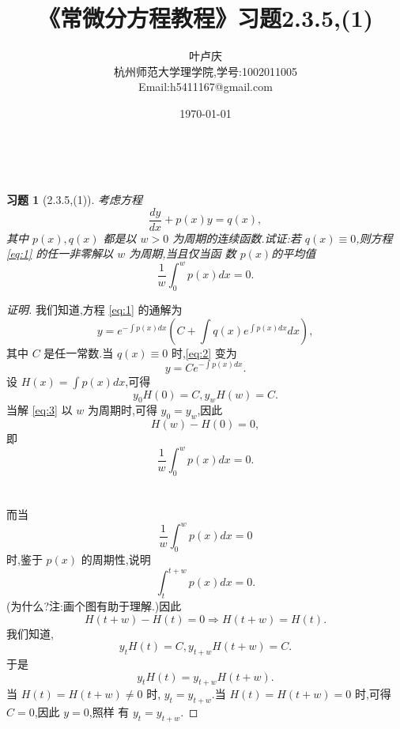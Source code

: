 \documentclass[a4paper, 12pt]{article} %
\title{\textbf{《常微分方程教程》习题2.3.5,(1)}}
\author{\small{叶卢庆}\\{\small{杭州师范大学理学院,学号:1002011005}}\\{\small{Email:h5411167@gmail.com}}}
\date{\today}
\makeatletter
\newtheorem*{cdtheorem}{习题}
\newenvironment{exercise}
{\bigskip\begin{mdframed}[backgroundcolor=gray!40,rightline=false,leftline=false,topline=false,bottomline=false]\begin{cdtheorem}}
    {\end{cdtheorem}\end{mdframed}\bigskip}
\renewcommand{\maketitle}{ %
  \renewcommand\refname{参考文献}
  \newcommand{\D}{\displaystyle}\newcommand{\ri}{\Rightarrow}
  \newcommand{\ds}{\displaystyle} \renewcommand{\ni}{\noindent}
  \newcommand{\pa}{\partial} \newcommand{\Om}{\Omega}
  \newcommand{\om}{\omega} \newcommand{\sik}{\sum_{i=1}^k}
  \newcommand{\vov}{\Vert\omega\Vert} \newcommand{\Umy}{U_{\mu_i,y^i}}
  \newcommand{\lamns}{\lambda_n^{^{\scriptstyle\sigma}}}
  \newcommand{\chiomn}{\chi_{_{\Omega_n}}}
  \newcommand{\ullim}{\underline{\lim}} \newcommand{\bsy}{\boldsymbol}
  \newcommand{\mvb}{\mathversion{bold}} \newcommand{\la}{\lambda}
  \newcommand{\La}{\Lambda} \newcommand{\va}{\varepsilon}
  \begin{flushright} %
    {\LARGE\@title} %
    
    \vspace{50pt} %
    
    {\large\@author} %
    \\\@date %
    
    \vspace{40pt}
  \end{flushright}
}
\makeatother
\begin{document}
\maketitle
\begin{exercise}[2.3.5,(1)]
  考虑方程
  \begin{equation}
    \label{eq:1}
    \frac{dy}{dx}+p(x)y=q(x),
  \end{equation}
  其中 $p(x),q(x)$ 都是以 $w>0$ 为周期的连续函数.试证:若 $q(x)\equiv
  0$,则方程 \eqref{eq:1} 的任一非零解以 $w$ 为周期,当且仅当函
  数 $p(x)$的平均值
$$
\frac{1}{w}\int_0^wp(x)dx=0.
$$
\end{exercise}
\begin{proof}[证明]
  我们知道,方程 \eqref{eq:1} 的通解为
  \begin{equation}
    \label{eq:2}
    y=e^{-\int p(x)dx}\left(C+\int q(x)e^{\int p(x)dx}dx\right),
  \end{equation}
  其中 $C$ 是任一常数.当 $q(x)\equiv 0$ 时,\eqref{eq:2} 变为
  \begin{equation}
    \label{eq:3}
    y=Ce^{-\int p(x)dx}.
  \end{equation}
  设 $H(x)=\int p(x)dx$,可得
$$
y_0H(0)=C,y_wH(w)=C.
$$
当解 \eqref{eq:3} 以 $w$ 为周期时,可得 $y_0=y_w$,因此
$$
H(w)-H(0)=0,
$$
即
$$
\frac{1}{w}\int_0^wp(x)dx=0.
$$
\\\\
而当
$$
\frac{1}{w}\int_0^wp(x)dx=0
$$
时,鉴于 $p(x)$ 的周期性,说明
$$
\int_t^{t+w}p(x)dx=0.
$$
(为什么?注:画个图有助于理解.)因此
$$
H(t+w)-H(t)=0\ri H(t+w)=H(t).
$$
我们知道,
$$
y_tH(t)=C,y_{t+w}H(t+w)=C.
$$
于是
$$
y_tH(t)=y_{t+w}H(t+w).
$$
当 $H(t)=H(t+w)\neq 0$ 时,
$y_t=y_{t+w}$.当 $H(t)=H(t+w)=0$ 时,可得$C=0$,因此 $y=0$,照样
有 $y_t=y_{t+w}$.
\end{proof}
\end{document}
